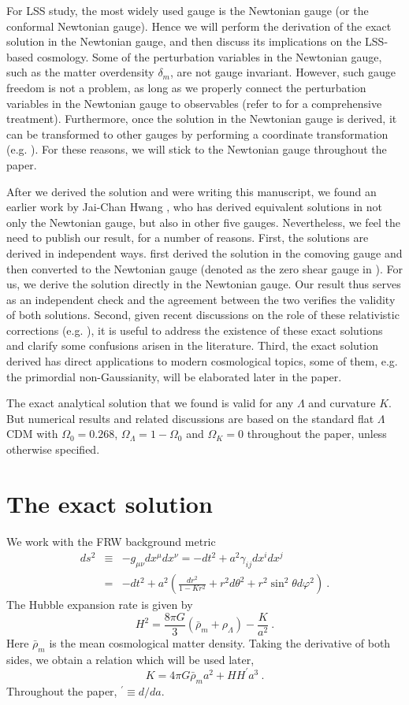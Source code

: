 \documentclass[aps,prl,showpacs,nobibnotes,twocolumn,
nobalancelastpage,superscriptaddress]{revtex4}
\newcommand{\be}{\begin{equation}}
\newcommand{\ee}{\end{equation}}
\newcommand{\ba}{\begin{eqnarray}}
\newcommand{\ea}{\end{eqnarray}}
\begin{document}
For LSS study,
the most widely used gauge is the Newtonian gauge (or the conformal Newtonian
gauge). Hence we will perform the derivation of the exact solution in the
Newtonian gauge, and then discuss its implications on the LSS-based
cosmology. Some of the 
perturbation variables in the Newtonian gauge, such as the matter overdensity
$\delta_m$, are not gauge invariant. However, such
gauge freedom is not a problem, as long as we properly connect the
perturbation variables  in the Newtonian gauge to observables (refer to
\cite{Yoo09} for a comprehensive treatment). Furthermore, once the solution in
the Newtonian gauge is derived, it can be transformed to other gauges by
performing a coordinate transformation (e.g. \cite{Kodama84,Ma95}). For these
reasons, we  will stick to the Newtonian gauge throughout the paper. 


After we derived the solution and were writing this manuscript, we found an
earlier work by Jai-Chan Hwang \cite{Hwang94}, who has derived equivalent
solutions in not only the Newtonian gauge, but also in other five gauges. Nevertheless, we feel the need to publish
our result, for a number of reasons. First, the solutions are derived in independent
ways. \cite{Hwang94} first derived the solution in the comoving gauge and then
converted to  the Newtonian gauge (denoted as the zero
shear gauge in \cite{Hwang94}).  For us, we derive the solution directly in
the Newtonian 
gauge. Our result thus serves as an independent check and the
agreement between the two  verifies the validity of both solutions.  Second,
given recent discussions on the role of these relativistic
corrections (e.g. \cite{Dent09}),  it is useful to address the existence of these exact solutions
and clarify some confusions arisen in the literature. Third, the exact solution
derived has  direct applications to modern cosmological topics, some of them,
e.g. the primordial non-Gaussianity,  will be
elaborated later in the paper.  

The exact analytical solution that we found is valid for any
$\Lambda$ and curvature $K$. But numerical results and related
discussions  are  based on  the standard flat $\Lambda$CDM with
$\Omega_0=0.268$,  
$\Omega_\Lambda=1-\Omega_0$ and $\Omega_K=0$ throughout the paper, unless
otherwise specified. 


\section{The exact solution}
We work with the FRW background metric 
\ba
ds^2&\equiv&-g_{\mu\nu}dx^{\mu}dx^{\nu}=
-dt^2+a^2\gamma_{ij}dx^idx^j \\
&=&-dt^2+a^2\left(\frac{dr^2}{1-Kr^2}+r^2d\theta^2+r^2\sin^2\theta
d\varphi^2\right) \nonumber\ .
\ea
The Hubble expansion rate is given by 
\be
\label{eqn:H}
H^2=\frac{8\pi G}{3}\left(\bar{\rho}_m+\rho_\Lambda\right)-\frac{K}{a^2}\ .
\ee
Here $\bar{\rho}_m$ is the mean cosmological matter density. 
Taking the derivative of both sides, we obtain a relation which will be used
later,
\be
\label{eqn:K}
K=4\pi G\bar{\rho}_ma^2+HH^{'}a^3\ . 
\ee
Throughout the paper, $^{'}\equiv d/da$. 
\end{document}
